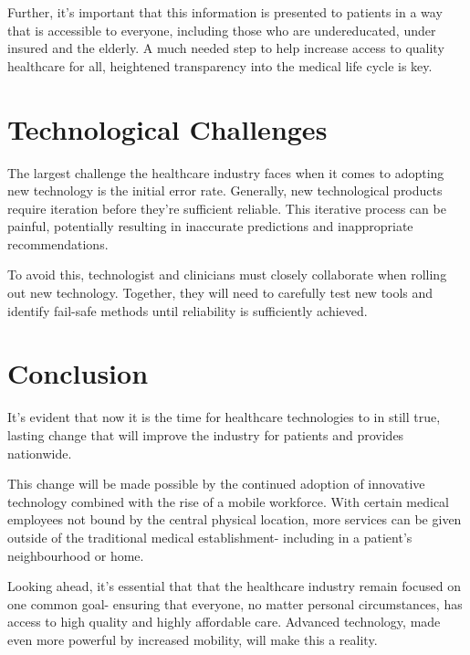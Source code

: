 \documentclass[12pt]{article}
\begin{document}
Further, it's important that this information is presented to patients in a way that is accessible to everyone, including those who are undereducated, under insured and the elderly. A much needed step to help increase access to quality healthcare for all, heightened transparency into the medical life cycle is key.

\section{Technological Challenges}

The largest challenge the healthcare industry faces when it comes to adopting new technology is the initial error rate. Generally, new technological products require iteration before they're sufficient reliable. This iterative process can be painful, potentially resulting in inaccurate predictions and inappropriate recommendations.

To avoid this, technologist and clinicians must closely collaborate when rolling out new technology. Together, they will need to carefully test new tools and identify fail-safe methods until reliability is sufficiently achieved.

\section{Conclusion}

It's evident that now it is the time for healthcare technologies to in still true, lasting change that will improve the industry for patients and provides nationwide.

This change will be made possible by the continued adoption of innovative technology combined with the rise of a mobile workforce. With certain medical employees not bound by the central physical location, more services can be given outside of the traditional medical establishment- including in a patient's neighbourhood or home.

Looking ahead, it's essential that that the healthcare industry remain focused on one common goal- ensuring that everyone, no matter personal circumstances, has access to high quality and highly affordable care. Advanced technology, made even more powerful by increased mobility, will make this a reality. 
\end{document}
